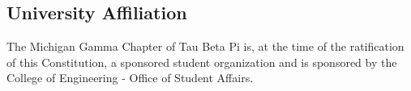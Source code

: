 \subsection{University Affiliation} \label{I.5}
The Michigan Gamma Chapter of Tau Beta Pi is, at the time of the ratification of this Constitution, a sponsored student organization and is sponsored by the College of Engineering - Office of Student Affairs.

